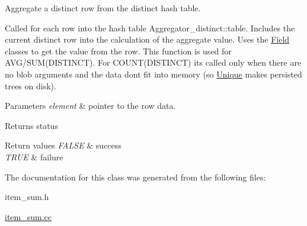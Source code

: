 Aggregate a distinct row from the distinct hash table.

Called for each row into the hash table \textquotesingle{}Aggregator\+\_\+distinct\+::table\textquotesingle{}. Includes the current distinct row into the calculation of the aggregate value. Uses the \mbox{\hyperlink{classField}{Field}} classes to get the value from the row. This function is used for A\+V\+G/\+S\+UM(D\+I\+S\+T\+I\+N\+CT). For C\+O\+U\+N\+T(\+D\+I\+S\+T\+I\+N\+C\+T) it\textquotesingle{}s called only when there are no blob arguments and the data don\textquotesingle{}t fit into memory (so \mbox{\hyperlink{classUnique}{Unique}} makes persisted trees on disk).


\begin{DoxyParams}{Parameters}
{\em element} & pointer to the row data.\\
\hline
\end{DoxyParams}
\begin{DoxyReturn}{Returns}
status 
\end{DoxyReturn}

\begin{DoxyRetVals}{Return values}
{\em F\+A\+L\+SE} & success \\
\hline
{\em T\+R\+UE} & failure \\
\hline
\end{DoxyRetVals}


The documentation for this class was generated from the following files\+:\begin{DoxyCompactItemize}
\item 
item\+\_\+sum.\+h\item 
\mbox{\hyperlink{item__sum_8cc}{item\+\_\+sum.\+cc}}\end{DoxyCompactItemize}
